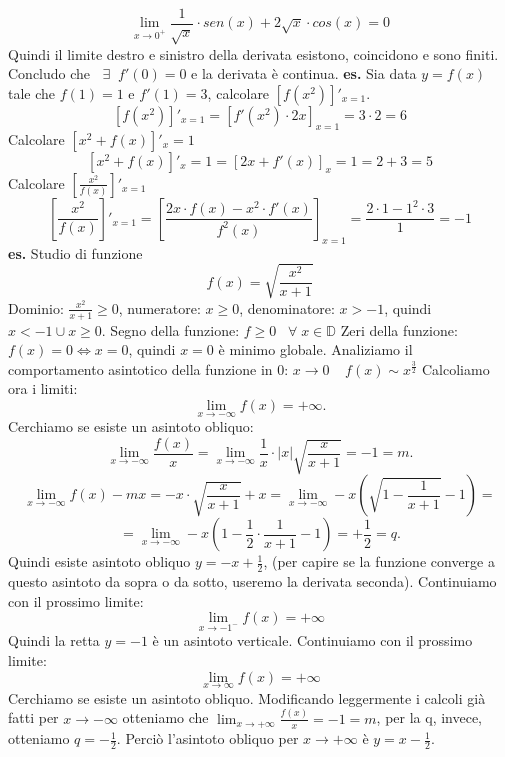 \[
    \lim_{x\rightarrow 0^+}\frac{1}{\sqrt{x}} \cdot  sen(x) + 2 \sqrt{x} \cdot cos(x) = 0
\]
Quindi il limite destro e sinistro della derivata esistono, coincidono e sono finiti. Concludo che $\;\;\exists\;\; f'(0) = 0$ e la derivata è continua.\newline
\newline
\newline
\textbf{es.} Sia data $y=f(x)$ tale che $f(1) = 1$ e $f'(1) = 3$, calcolare $[f(x^2)]'_{x=1}$.
\[
    [f(x^2)]'_{x=1} = [f'(x^2)\cdot 2x]_{x=1} = 3 \cdot 2 = 6
\]
Calcolare $[x^2 + f(x)]'_x=1$
\[
    [x^2 + f(x)]'_x=1 = [2x +f'(x)]_x=1 = 2+3 = 5
\]
Calcolare $[\frac{x^2}{f(x)}]'_{x=1}$
\[
    [\frac{x^2}{f(x)}]'_{x=1} = [\frac{2x \cdot f(x) -x^2 \cdot f'(x)}{f^2(x)}]_{x=1} = \frac{2 \cdot 1 -1^2 \cdot 3}{1} = -1 
\]\newline
\newline
\newline
\textbf{es.} Studio di funzione
\[
    f(x) = \sqrt{\frac{x^2}{x+1}}
\]
Dominio: $\frac{x^2}{x+1} \geq 0$, numeratore: $x\geq 0$, denominatore: $x> -1$, quindi $x<-1 \cup x \geq 0$. \newline
Segno della funzione: $f\geq 0 \;\; \;\forall\; x \in \mathbb{D}$\newline
Zeri della funzione: $f(x) = 0 \Leftrightarrow  x = 0$, quindi $x=0$ è minimo globale.\newline
Analiziamo il comportamento asintotico della funzione in $0$: $ x \rightarrow  0 \;\;\;\; f(x) \sim  x^{\frac{3}{2}}$ \newline
Calcoliamo ora i limiti:
\[
    \lim_{x\rightarrow -\infty} f(x) = +\infty.
\]
Cerchiamo se esiste un asintoto obliquo:
\[
    \lim_{x\rightarrow -\infty} \frac{f(x)}{x} = \lim_{x\rightarrow -\infty} \frac{1}{x} \cdot |x|\sqrt{\frac{x}{x+1}} = -1 = m.
\]
\[
    \lim_{x\rightarrow -\infty} f(x) - mx = -x \cdot \sqrt{\frac{x}{x+1}} +x = \lim_{x\rightarrow -\infty} -x\left(\sqrt{1-\frac{1}{x+1}}-1\right)=
\]
\[
    = \lim_{x\rightarrow -\infty} -x( 1 - \frac{1}{2} \cdot  \frac{1}{x+1} -1) = +\frac{1}{2} = q.
\]
Quindi esiste asintoto obliquo $y=-x + \frac{1}{2}$, (per capire se la funzione converge a questo asintoto da sopra o da sotto, useremo la derivata seconda). Continuiamo con il prossimo limite:
\[
    \lim_{x\rightarrow -1^-} f(x) = +\infty
\]
Quindi la retta $y=-1$ è un asintoto verticale. Continuiamo con il prossimo limite:
\[
    \lim_{x\rightarrow \infty} f(x) = +\infty
\]
Cerchiamo se esiste un asintoto obliquo. Modificando leggermente i calcoli già fatti per $x \rightarrow  -\infty$ otteniamo che $\lim_{x\rightarrow +\infty} \frac{f(x)}{x} = -1 = m$, per la q, invece, otteniamo $q = - \frac{1}{2}$. Perciò l'asintoto obliquo per $x \rightarrow  + \infty$ è $y = x-\frac{1}{2}$.\newline
